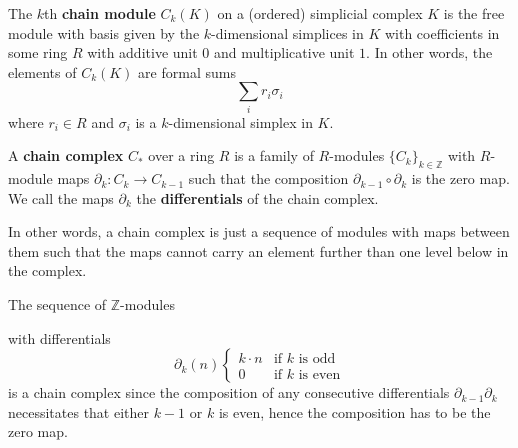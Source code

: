 \begin{definition}\label{chainmodulesimp}
  The $k$th \textbf{chain module} $C_{k}(K)$ on a (ordered) simplicial complex $K$ is the free module with basis given by the $k$-dimensional simplices in $K$ with coefficients in some ring $R$ with additive unit $0$ and multiplicative unit $1$. In other words, the elements of $C_{k}(K)$ are formal sums
  \[ \sum_{i} r_{i}\sigma_{i}\]
  where $r_{i} \in R$ and $\sigma_{i}$ is a $k$-dimensional simplex in $K$. %
\end{definition}


\begin{definition}
  A \textbf{chain complex} $C_{*}$ over a ring $R$ is a family of $R$-modules $\{C_{k}\}_{k
  \in \mathbb{Z}}$ with $R$-module maps $\partial_{k}: C_{k} \to C_{k-1}$ such that the composition $\partial_{k-1} \circ \partial_{k}$ is the zero map. We call the maps $\partial_{k}$ the \textbf{differentials} of the chain complex.
\end{definition}

In other words, a chain complex is just a sequence of modules with maps between them such that the maps cannot carry an element further than one level below in the complex.
\begin{example}
  The sequence of $\mathbb{Z}$-modules
\begin{center}
\end{center}
with differentials
\[ \partial_{k}(n)
  \begin{cases} k \cdot n & \text{if }k \text{ is odd} \\
                0 & \text{if }k \text{ is even}
    \end{cases}
  \]
is a chain complex since the composition of any consecutive differentials $\partial_{k-1}\partial_{k}$ necessitates that either $k-1$ or $k$ is even, hence the composition has to be the zero map.
\end{example}


